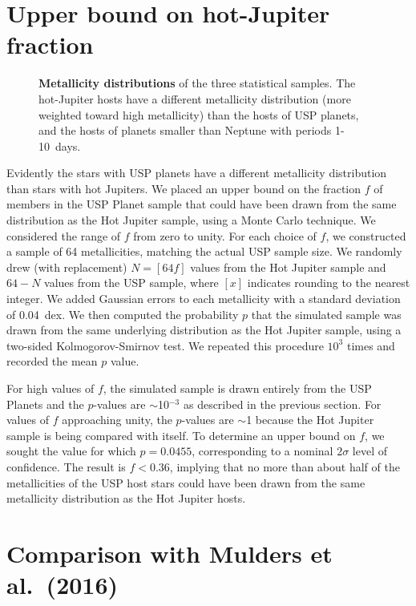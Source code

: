 \documentclass[twocolumn]{aastex6}
\begin{document}
\section{Upper bound on hot-Jupiter fraction}

\begin{figure*}[ht!]
\begin{center}
 \leavevmode
\end{center}
\caption{ {\bf Metallicity distributions} of the three statistical
  samples.  The hot-Jupiter hosts have a different metallicity
  distribution (more weighted toward high metallicity) than the hosts of USP planets,
  and the hosts of planets smaller than Neptune with periods 1-10~days.}
  \label{fig:metallicity}
\end{figure*}

Evidently the stars with USP planets have a different metallicity
distribution than stars with hot Jupiters.  We placed an upper bound
on the fraction $f$ of members in the USP Planet sample that could
have been drawn from the same distribution as the Hot Jupiter sample,
using a Monte Carlo technique. We considered the range of $f$ from
zero to unity. For each choice of $f$, we constructed a sample of 64
metallicities, matching the actual USP sample size. We randomly drew
(with replacement) $N=[64f]$ values from the Hot Jupiter sample and
$64-N$ values from the USP sample, where $[x]$ indicates rounding
to the nearest integer. We added Gaussian errors to each metallicity
with a standard deviation of 0.04~dex. We then computed the
probability $p$ that the simulated sample was drawn from the same
underlying distribution as the Hot Jupiter sample, using a two-sided
Kolmogorov-Smirnov test. We repeated this procedure $10^3$ times and
recorded the mean $p$ value.

For high values of $f$, the simulated sample is drawn entirely from the
USP Planets and the $p$-values are $\sim$10$^{-3}$ as described in the
previous section. For values of $f$ approaching unity, the $p$-values
are $\sim$1 because the Hot Jupiter sample is being compared with
itself. To determine an upper bound on $f$, we sought the value for
which $p=0.0455$, corresponding to a nominal 2$\sigma$ level of
confidence. The result is $f<0.36$, implying that no more than about
half of the metallicities of the USP host stars could have been drawn
from the same metallicity distribution as the Hot Jupiter hosts.

\section{Comparison with Mulders et al.~(2016)}
\label{sec:mulders}
\end{document}
